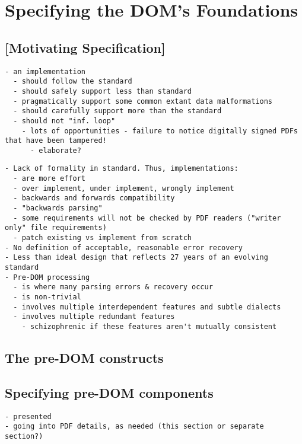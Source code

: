 \section{Specifying the DOM's Foundations }
\label{sec:specifying}


\subsection{[Motivating Specification]}

\begin{lstlisting}[style=meta]
- an implementation
  - should follow the standard
  - should safely support less than standard
  - pragmatically support some common extant data malformations
  - should carefully support more than the standard
  - should not "inf. loop"
    - lots of opportunities - failure to notice digitally signed PDFs that have been tampered! 
      - elaborate?
\end{lstlisting}

\begin{lstlisting}[style=meta]
- Lack of formality in standard. Thus, implementations:
  - are more effort
  - over implement, under implement, wrongly implement
  - backwards and forwards compatibility
  - "backwards parsing"
  - some requirements will not be checked by PDF readers ("writer only" file requirements) 
  - patch existing vs implement from scratch
- No definition of acceptable, reasonable error recovery
- Less than ideal design that reflects 27 years of an evolving standard
- Pre-DOM processing
  - is where many parsing errors & recovery occur
  - is non-trivial
  - involves multiple interdependent features and subtle dialects
  - involves multiple redundant features
    - schizophrenic if these features aren't mutually consistent
\end{lstlisting}

\subsection{The pre-DOM constructs}

\subsection{Specifying pre-DOM components}
\begin{lstlisting}[style=meta]
- presented
- going into PDF details, as needed (this section or separate section?)
\end{lstlisting}
